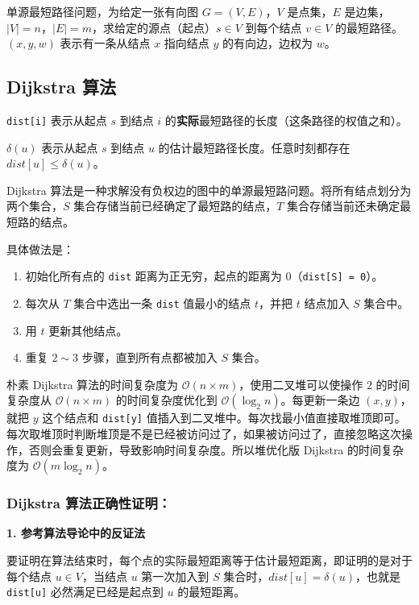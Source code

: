 
单源最短路径问题，为给定一张有向图 $G = (V, E)$，$V$ 是点集，$E$ 是边集，$|V|= n$，$|E| = m$，求给定的源点（起点）$s \in V$ 到每个结点 $v \in V$ 的最短路径。$(x, y, w)$ 表示有一条从结点 $x$ 指向结点 $y$ 的有向边，边权为 $w$。

\subsection{Dijkstra 算法}

\verb|dist[i]| 表示从起点 $s$ 到结点 $i$ 的\textbf{实际}最短路径的长度（这条路径的权值之和）。

$\delta(u)$ 表示从起点 $s$ 到结点 $u$ 的估计最短路径长度。任意时刻都存在 $dist[u] \leq \delta(u)$。
   
Dijkstra 算法是一种求解没有负权边的图中的单源最短路问题。将所有结点划分为两个集合，$S$ 集合存储当前已经确定了最短路的结点，$T$ 集合存储当前还未确定最短路的结点。

具体做法是：
\begin{enumerate}
\item 初始化所有点的 \verb|dist| 距离为正无穷，起点的距离为 $0$（\verb|dist[S] = 0|）。
\item 每次从 $T$ 集合中选出一条 \verb|dist| 值最小的结点 $t$，并把 $t$ 结点加入 $S$ 集合中。
\item 用 $t$ 更新其他结点。
\item 重复 $2 \sim 3$ 步骤，直到所有点都被加入 $S$ 集合。
\end{enumerate}

朴素 Dijkstra 算法的时间复杂度为 $\mathcal{O}(n \times m)$，使用二叉堆可以使操作 $2$ 的时间复杂度从 $\mathcal{O}(n \times m)$ 的时间复杂度优化到 $\mathcal{O}(\log_2 n)$。每更新一条边 $(x, y)$，就把 $y$ 这个结点和 \verb|dist[y]| 值插入到二叉堆中。每次找最小值直接取堆顶即可。每次取堆顶时判断堆顶是不是已经被访问过了，如果被访问过了，直接忽略这次操作，否则会重复更新，导致影响时间复杂度。所以堆优化版 Dijkstra 的时间复杂度为 $\mathcal{O}(m \log_2 n)$。

\subsubsection{Dijkstra 算法正确性证明：}

\textbf{1. 参考算法导论中的反证法}

要证明在算法结束时，每个点的实际最短距离等于估计最短距离，即证明的是对于每个结点 $u \in V$，当结点 $u$ 第一次加入到 $S$ 集合时，$dist[u] =\delta(u)$，也就是 \verb|dist[u]| 必然满足已经是起点到 $u$ 的最短距离。


